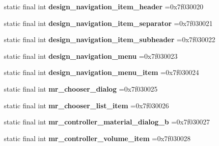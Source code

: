 \begin{DoxyCompactItemize}
static final int {\bfseries design\+\_\+navigation\+\_\+item\+\_\+header} =0x7f030020
\item 
\mbox{\label{classproject4_1_1xaria_1_1R_1_1layout_a627d622994ec64c3fd1983b1f41f6c83}} 
static final int {\bfseries design\+\_\+navigation\+\_\+item\+\_\+separator} =0x7f030021
\item 
\mbox{\label{classproject4_1_1xaria_1_1R_1_1layout_afac7e36277ddb26470816b2b12f1d70c}} 
static final int {\bfseries design\+\_\+navigation\+\_\+item\+\_\+subheader} =0x7f030022
\item 
\mbox{\label{classproject4_1_1xaria_1_1R_1_1layout_a00a641c5fe50828cc2eb947cb1ea58b0}} 
static final int {\bfseries design\+\_\+navigation\+\_\+menu} =0x7f030023
\item 
\mbox{\label{classproject4_1_1xaria_1_1R_1_1layout_a7f963bb0b84f1a7a149cd39f97382aa2}} 
static final int {\bfseries design\+\_\+navigation\+\_\+menu\+\_\+item} =0x7f030024
\item 
\mbox{\label{classproject4_1_1xaria_1_1R_1_1layout_ad2d91903482bf328952ad39727aca23d}} 
static final int {\bfseries mr\+\_\+chooser\+\_\+dialog} =0x7f030025
\item 
\mbox{\label{classproject4_1_1xaria_1_1R_1_1layout_abe50a931d32b14f5861b96a5e1120509}} 
static final int {\bfseries mr\+\_\+chooser\+\_\+list\+\_\+item} =0x7f030026
\item 
\mbox{\label{classproject4_1_1xaria_1_1R_1_1layout_ab02c2a9233dd81cdfae65c61192f0c12}} 
static final int {\bfseries mr\+\_\+controller\+\_\+material\+\_\+dialog\+\_\+b} =0x7f030027
\item 
\mbox{\label{classproject4_1_1xaria_1_1R_1_1layout_ada21de190500755e0ae88d0b0fb96425}} 
static final int {\bfseries mr\+\_\+controller\+\_\+volume\+\_\+item} =0x7f030028
\item 
\mbox{\label{classproject4_1_1xaria_1_1R_1_1layout_a1d09ed3d7c59df0f6f2c838dce691e33}} 

\end{DoxyCompactItemize}
